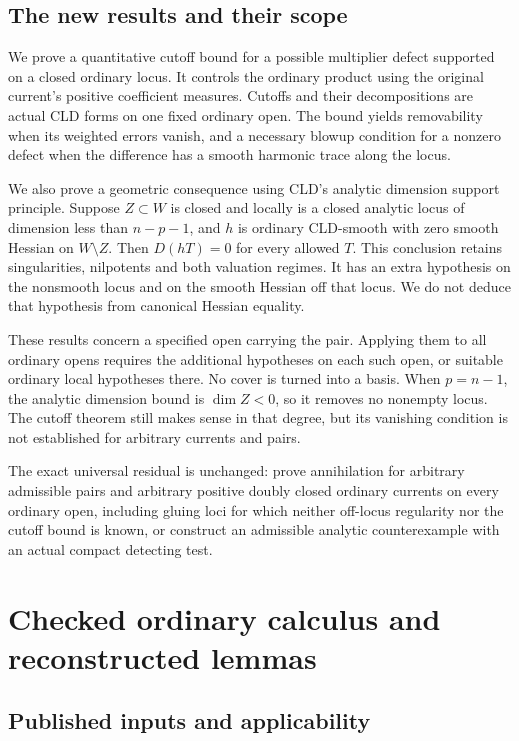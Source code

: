 \documentclass[11pt]{article}
\begin{document}
\subsection{The new results and their scope}

We prove a quantitative cutoff bound for a possible multiplier defect supported on a closed ordinary locus. It controls the ordinary product using the original current's positive coefficient measures. Cutoffs and their decompositions are actual CLD forms on one fixed ordinary open. The bound yields removability when its weighted errors vanish, and a necessary blowup condition for a nonzero defect when the difference has a smooth harmonic trace along the locus.

We also prove a geometric consequence using CLD's analytic dimension support principle. Suppose \(Z\subset W\) is closed and locally is a closed analytic locus of dimension less than \(n-p-1\), and \(h\) is ordinary CLD-smooth with zero smooth Hessian on \(W\setminus Z\). Then \(D(hT)=0\) for every allowed \(T\). This conclusion retains singularities, nilpotents and both valuation regimes. It has an extra hypothesis on the nonsmooth locus and on the smooth Hessian off that locus. We do not deduce that hypothesis from canonical Hessian equality.

These results concern a specified open carrying the pair. Applying them to all ordinary opens requires the additional hypotheses on each such open, or suitable ordinary local hypotheses there. No cover is turned into a basis. When \(p=n-1\), the analytic dimension bound is \(\dim Z<0\), so it removes no nonempty locus. The cutoff theorem still makes sense in that degree, but its vanishing condition is not established for arbitrary currents and pairs.

The exact universal residual is unchanged: prove annihilation for arbitrary admissible pairs and arbitrary positive doubly closed ordinary currents on every ordinary open, including gluing loci for which neither off-locus regularity nor the cutoff bound is known, or construct an admissible analytic counterexample with an actual compact detecting test.


\section{Checked ordinary calculus and reconstructed lemmas}

\subsection{Published inputs and applicability}
\end{document}
